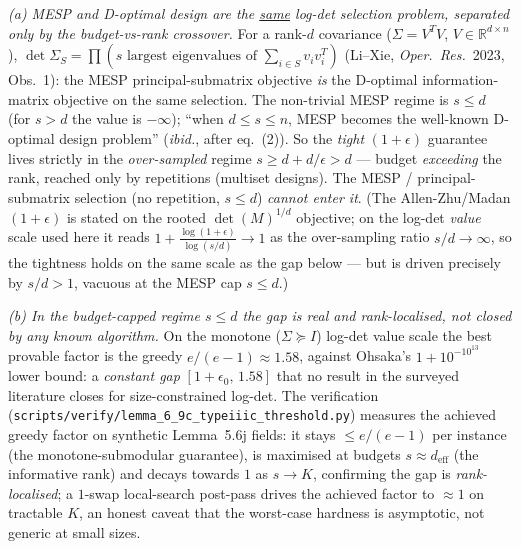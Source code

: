 \documentclass[
]{article}
\begin{document}
\emph{(a) MESP and D-optimal design are the \underline{same} log-det selection
problem, separated only by the budget-vs-rank crossover.} For a rank-$d$
covariance ($\Sigma=V^TV$, $V\in\mathbb R^{d\times n}$), $\det\Sigma_S=
\prod(\text{$s$ largest eigenvalues of }\sum_{i\in S}v_iv_i^T)$ (Li--Xie,
\emph{Oper.\ Res.}\ 2023, Obs.\ 1): the MESP principal-submatrix objective
\emph{is} the D-optimal information-matrix objective on the same selection. The
non-trivial MESP regime is $s\le d$ (for $s>d$ the value is $-\infty$); ``when
$d\le s\le n$, MESP becomes the well-known D-optimal design problem''
(\emph{ibid.}, after eq.\ (2)). So the \emph{tight} $(1+\epsilon)$ guarantee
lives strictly in the \emph{over-sampled} regime $s\ge d+d/\epsilon>d$ ---
budget \emph{exceeding} the rank, reached only by repetitions (multiset
designs). The MESP / principal-submatrix selection (no repetition, $s\le d$)
\emph{cannot enter it}. (The Allen-Zhu/Madan $(1+\epsilon)$ is stated on the
rooted $\det(M)^{1/d}$ objective; on the log-det \emph{value} scale used here it
reads $1+\tfrac{\log(1+\epsilon)}{\log(s/d)}\to1$ as the over-sampling ratio
$s/d\to\infty$, so the tightness holds on the same scale as the gap below ---
but is driven precisely by $s/d>1$, vacuous at the MESP cap $s\le d$.)

\emph{(b) In the budget-capped regime $s\le d$ the gap is real and
rank-localised, not closed by any known algorithm.} On the monotone
($\Sigma\succeq I$) log-det value scale the best provable factor is the greedy
$e/(e-1)\approx1.58$, against Ohsaka's $1+10^{-10^{13}}$ lower bound: a
\emph{constant gap} $[1+\epsilon_0,\,1.58]$ that no result in the surveyed
literature closes for size-constrained log-det. The verification
(\texttt{scripts/verify/lemma\_6\_9c\_typeiiic\_threshold.py}) measures the
achieved greedy factor on synthetic Lemma~5.6j fields: it stays $\le e/(e-1)$
per instance (the monotone-submodular guarantee), is maximised at budgets
$s\approx d_{\mathrm{eff}}$ (the informative rank) and decays towards $1$ as
$s\to K$, confirming the gap is \emph{rank-localised}; a $1$-swap local-search
post-pass drives the achieved factor to $\approx1$ on tractable $K$, an honest
caveat that the worst-case hardness is asymptotic, not generic at small sizes.
\end{document}
